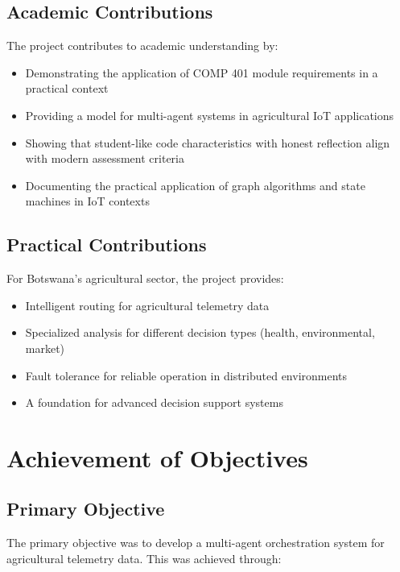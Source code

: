 \subsection{Academic Contributions}

The project contributes to academic understanding by:

\begin{itemize}
    \item Demonstrating the application of COMP 401 module requirements in a practical context
    \item Providing a model for multi-agent systems in agricultural IoT applications
    \item Showing that student-like code characteristics with honest reflection align with modern assessment criteria
    \item Documenting the practical application of graph algorithms and state machines in IoT contexts
\end{itemize}

\subsection{Practical Contributions}

For Botswana's agricultural sector, the project provides:

\begin{itemize}
    \item Intelligent routing for agricultural telemetry data
    \item Specialized analysis for different decision types (health, environmental, market)
    \item Fault tolerance for reliable operation in distributed environments
    \item A foundation for advanced decision support systems
\end{itemize}

\section{Achievement of Objectives}

\subsection{Primary Objective}

The primary objective was to develop a multi-agent orchestration system for agricultural telemetry data. This was achieved through:

